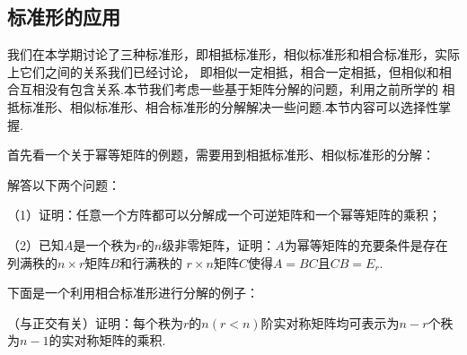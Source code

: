 \subsection{标准形的应用}
我们在本学期讨论了三种标准形，即相抵标准形，相似标准形和相合标准形，实际上它们之间的关系我们已经讨论，
即相似一定相抵，相合一定相抵，但相似和相合互相没有包含关系.本节我们考虑一些基于矩阵分解的问题，利用之前所学的
相抵标准形、相似标准形、相合标准形的分解解决一些问题.本节内容可以选择性掌握.

首先看一个关于幂等矩阵的例题，需要用到相抵标准形、相似标准形的分解：
\begin{example}
	解答以下两个问题：

	\textup{（1）}证明：任意一个方阵都可以分解成一个可逆矩阵和一个幂等矩阵的乘积\textup{；}
	
	\textup{（2）}已知$A$是一个秩为$r$的$n$级非零矩阵，证明：$A$为幂等矩阵的充要条件是存在列满秩的$n\times r$矩阵$B$和行满秩的
	$r\times n$矩阵$C$使得$A=BC$且$CB=E_r$.
\end{example}
下面是一个利用相合标准形进行分解的例子：
\begin{example}
	（与正交有关）证明：每个秩为$r$的$n(r<n)$阶实对称矩阵均可表示为$n-r$个秩为$n-1$的实对称矩阵的乘积.
\end{example}
